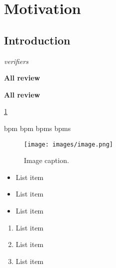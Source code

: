\section{Motivation}
\label{sec:01-motivation}

\subsection{Introduction}
\label{subsec:01-motivation-introduction}

\textit{verifiers}

\textbf{All review}

\textbf{All review}

\cite{weske2007bpm}
\citeauthor{weske2007bpm}

\cref{sec:01-motivation} %


\gls{bpm} %
\Gls{bpm} %
\glspl{bpm} %
\Glspl{bpm} %


\begin{figure}
    \centering
    \texttt{[image: images/image.png]}
    \caption{Image caption.}
    \label{fig:image}
\end{figure}

\begin{itemize}
    \item List item
    \item List item
    \item List item
\end{itemize}

\begin{enumerate}
    \item List item
    \item List item
    \item List item
\end{enumerate}